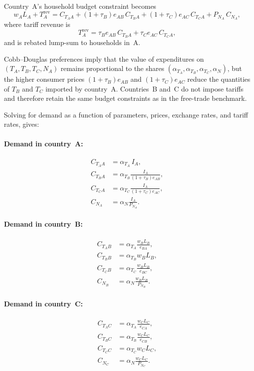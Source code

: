 \documentclass[11pt]{article}
\begin{document}
Country~A’s household budget constraint becomes
\begin{equation}
w_A L_A + T_A^{\mathrm{rev}}
=
C_{T_A A}
+ (1+\tau_B)e_{AB}\, C_{T_B A}
+ (1+\tau_C)e_{AC}\, C_{T_C A}
+ P_{N_A}\, C_{N_A},
\end{equation}
where tariff revenue is
\begin{equation}
T_A^{\mathrm{rev}}
= \tau_B e_{AB}\, C_{T_B A}
+ \tau_C e_{AC}\, C_{T_C A},
\end{equation}
and is rebated lump-sum to households in~A.

Cobb--Douglas preferences imply that the value of expenditures on 
$(T_A, T_B, T_C, N_A)$ remains proportional to the shares 
$(\alpha_{T_A},\alpha_{T_B},\alpha_{T_C},\alpha_N)$, but the higher consumer 
prices $(1+\tau_B)e_{AB}$ and $(1+\tau_C)e_{AC}$ reduce the quantities of 
$T_B$ and $T_C$ imported by country~A.  Countries~B and~C do not impose tariffs 
and therefore retain the same budget constraints as in the free-trade benchmark. 

Solving for demand as a function of parameters, prices, exchange rates, and tariff rates, gives:

\paragraph{Demand in country~A:}
\begin{align}
C_{T_A A} &= \alpha_{T_A}\, I_A, \\[6pt]
C_{T_B A} &= \alpha_{T_B} \frac{I_A}{(1+\tau_B)e_{AB}}, \\[6pt]
C_{T_C A} &= \alpha_{T_C} \frac{I_A}{(1+\tau_C)e_{AC}}, \\[6pt]
C_{N_A}   &= \alpha_N \frac{I_A}{P_{N_A}}.
\end{align}

\paragraph{Demand in country~B:}
\begin{align}
C_{T_A B} &= \alpha_{T_A} \frac{w_B L_B}{e_{BA}}, \\[6pt]
C_{T_B B} &= \alpha_{T_B} w_B L_B, \\[6pt]
C_{T_C B} &= \alpha_{T_C} \frac{w_B L_B}{e_{BC}}, \\[6pt]
C_{N_B}   &= \alpha_N \frac{w_B L_B}{P_{N_B}}.
\end{align}

\paragraph{Demand in country~C:}
\begin{align}
C_{T_A C} &= \alpha_{T_A} \frac{w_C L_C}{e_{CA}}, \\[6pt]
C_{T_B C} &= \alpha_{T_B} \frac{w_C L_C}{e_{CB}}, \\[6pt]
C_{T_C C} &= \alpha_{T_C} w_C L_C, \\[6pt]
C_{N_C}   &= \alpha_N \frac{w_C L_C}{P_{N_C}}.
\end{align}
\end{document}

